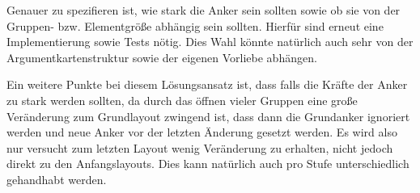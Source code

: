 Genauer zu spezifieren ist, wie stark die Anker sein sollten sowie ob sie von der Gruppen- bzw. Elementgröße abhängig sein sollten. Hierfür sind erneut eine Implementierung sowie Tests nötig. Dies Wahl könnte natürlich auch sehr von der Argumentkartenstruktur sowie der eigenen Vorliebe abhängen.

Ein weitere Punkte bei diesem Lösungsansatz ist, dass falls die Kräfte der Anker zu stark werden sollten, da durch das öffnen vieler Gruppen eine große Veränderung zum Grundlayout zwingend ist, dass dann die Grundanker ignoriert werden und neue Anker vor der letzten Änderung gesetzt werden. Es wird also nur versucht zum letzten Layout wenig Veränderung zu erhalten, nicht jedoch direkt zu den Anfangslayouts. Dies kann natürlich auch pro Stufe unterschiedlich gehandhabt werden.


